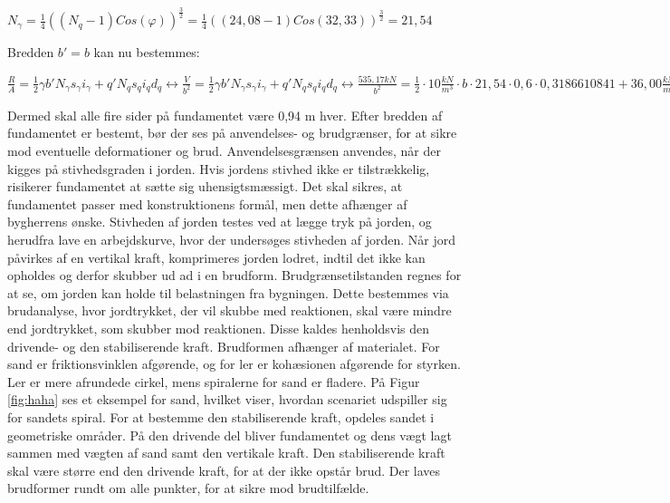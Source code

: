 \begin{center}
	$N_\gamma = \frac{1}{4}((N_q - 1)Cos(\varphi))^\frac{3}{2} = \frac{1}{4}((24,\!08 - 1)Cos(32,\!33))^\frac{3}{2}=21,\!54$
\end{center}

Bredden $b'=b$ kan nu bestemmes: 
\begin{center}
	$\frac{R}{A} = \frac{1}{2} \gamma b' N_\gamma s_\gamma i_\gamma + q' N_q s_q i_q d_q \leftrightarrow \frac{V}{b^2} = \frac{1}{2} \gamma b' N_\gamma s_\gamma i_\gamma + q' N_q s_q i_q d_q \leftrightarrow \frac{535,\!17 kN}{b^2} = \frac{1}{2}\cdot 10 \frac{kN}{m^3}\cdot b\cdot 21,\!54\cdot 0,\!6 \cdot 0,\!3186610841 + 36,\!00 \frac{kN}{m^2}\cdot 24,\!08 \cdot 1,\!2 \cdot 0,\!56 \cdot 1) = 0,\!94 m$
\end{center}

Dermed skal alle fire sider på fundamentet være 0,94 m hver.
\newline
\newline
Efter bredden af fundamentet er bestemt, bør der ses på anvendelses- og brudgrænser, for at sikre mod eventuelle deformationer og brud. Anvendelsesgrænsen anvendes, når der kigges på stivhedsgraden i jorden. Hvis jordens stivhed ikke er tilstrækkelig, risikerer fundamentet at sætte sig uhensigtsmæssigt. Det skal sikres, at fundamentet passer med konstruktionens formål, men dette afhænger af bygherrens ønske. 
\newline \indent{     }  Stivheden af jorden testes ved at lægge tryk på jorden, og herudfra lave en arbejdskurve, hvor der undersøges stivheden af jorden.   
\newline \indent{     }  Når jord påvirkes af en vertikal kraft, komprimeres jorden lodret, indtil det ikke kan opholdes og derfor skubber ud ad i en brudform. Brudgrænsetilstanden regnes for at se, om jorden kan holde til belastningen fra bygningen. Dette bestemmes via brudanalyse, hvor jordtrykket, der vil skubbe med reaktionen, skal være mindre end jordtrykket, som skubber mod reaktionen. Disse kaldes henholdsvis den drivende- og den stabiliserende kraft. Brudformen afhænger af materialet. For sand er friktionsvinklen afgørende, og for ler er kohæsionen afgørende for styrken. Ler er mere afrundede cirkel, mens spiralerne for sand er fladere. 
\newline \indent{     }  På Figur \ref{fig:haha} ses et eksempel for sand, hvilket viser, hvordan scenariet udspiller sig for sandets spiral. For at bestemme den stabiliserende kraft, opdeles sandet i geometriske områder. På den drivende del bliver fundamentet og dens vægt lagt sammen med vægten af sand samt den vertikale kraft. Den stabiliserende kraft skal være større end den drivende kraft, for at der ikke opstår brud. Der laves brudformer rundt om alle punkter, for at sikre mod brudtilfælde. 

